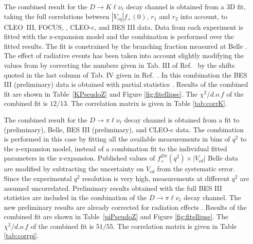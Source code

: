 The combined result for the $D\to K \ell\nu_{\ell}$ decay channel is obtained from a 3D fit, 
taking the full correlations between $|V_{cq}|f_+(0)$, $r_1$ and $r_2$ into account, 
to CLEO~III, FOCUS, \babar, CLEO-c, and BES III data. Data from each experiment is fitted with the 
z-expansion model and the combination is performed over the fitted results.   
The fit is constrained by the branching fraction measured at Belle \cite{Widhalm:2006wz}.
The effect of radiative events has been taken into account slightly modifying the values from \babar by 
correcting the numbers given in Tab. III of Ref.~\cite{Aubert:2007wg} by the shifts quoted in the last 
column of Tab. IV given in Ref.~\cite{Aubert:2007wg}. In this combination the BES III (preliminary) 
data is obtained with partial statistics \cite{BESIII}.
Results of the combined fit are shown in Table~\ref{KPseudoZ} and Figure \ref{fig:fitellipse}.
The $\chi^2/d.o.f$ of the combined fit is $12/13$. 
The correlation matrix is given in Table \ref{tab:corrK}.

The combined result for the $D\to \pi \ell\nu_{\ell}$ decay channel is obtained from a fit 
to \babar (preliminary), Belle, BES III (preliminary), and CLEO-c data. The combination is performed in this case 
by fitting all the available measurements in bins of $q^2$ to the z-expansion model, instead of a combination fit to the 
individual fitted parameters in the z-expansion. 
Published values of $f^{D\pi}_{+} (q^2) \times |V_{cd}|$ Belle data \cite{Widhalm:2006wz} are modified by subtracting the uncertainty on $V_{cd}$ 
from the systematic error. Since the experimental $q^2$ resolution is very high, measurements at different $q^2$ are assumed uncorrelated. 
Preliminary results obtained with the full BES III statistics \cite{BESIII-new} are included 
in the combination of the $D\to \pi \ell\nu_{\ell}$ decay channel.
The new preliminary \babar results are already corrected for radiation effects \cite{babar-new}.
Results of the combined fit are shown in Table~\ref{piPseudoZ} and Figure \ref{fig:fitellipse}.
The $\chi^2/d.o.f$ of the combined fit is $51/55$. 
The correlation matrix is given in Table \ref{tab:corrpi}.

